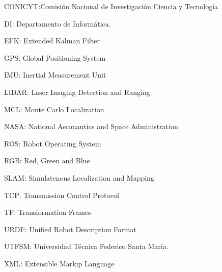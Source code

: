 
{\setlength{\parskip}{0cm} %

CONICYT:Comisión Nacional de Investigación Ciencia y Tecnología

DI: Departamento de Informática.

EFK: Extended Kalman Filter

GPS: Global Positioning System

IMU: Inertial Measurement Unit

LIDAR: Laser Imaging Detection and Ranging

MCL: Monte Carlo Localization

NASA: National Aeronautics and Space Administration

ROS: Robot Operating System

RGB: Red, Green and Blue

SLAM: Simulatenous Localization and Mapping

TCP: Transmission Control Protocol

TF: Transformation Frames

URDF: Unified Robot Description Format

UTFSM: Universidad Técnica Federico Santa María.

XML: Extensible Markip Language

}

